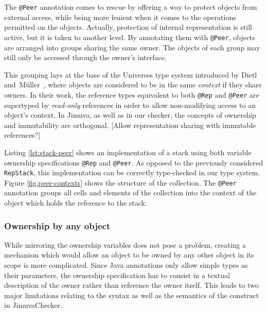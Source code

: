 \documentclass{pracamgr}
\theoremstyle{all}
\newcommand{\todo}[1]{{\color{red} [#1] }}
\begin{document}
The \texttt{@Peer} annotation comes to rescue by offering a way to
protect objects from external access, while being more lenient when it
comes to the operations permitted on the objects. Actually, protection
of internal representation is still active, but it is taken to another
level. By annotating them with \texttt{@Peer}, objects are arranged
into groups sharing the same owner. The objects of each group may
still only be accessed through the owner's interface.

This grouping lays at the base of the Universes type system introduced
by Dietl and~Müller~\cite{universes}, where objects are considered to
be in the same \emph{context} if they share owners. In their work, the
reference types equivalent to both \texttt{@Rep} and \texttt{@Peer}
are supertyped by \emph{read-only} references in order to allow
non-modifying access to an object's context. In Jimuva, as well as in
our checker, the concepts of ownership and immutability are
orthogonal. \todo{Allow representation sharing with immutable
  references?}

Listing \ref{lst:stack-peer} shows an implementation of a stack using
both variable ownership specifications \texttt{@Rep} and
\texttt{@Peer}. As opposed to the previously considered
\texttt{RepStack}, this implementation can be correctly type-checked
in our type system. Figure \ref{fig:peer-contexts} shows the structure
of the collection. The \texttt{@Peer} annotation groups all cells and
elements of the collection into the context of the object which holds
the reference to the stack.

\subsubsection{Ownership by any object}

While mirroring the ownership variables does not pose a problem,
creating a mechanism which would allow an object to be owned by any
other object in its scope is more complicated. Since Java annotations
only allow simple types as their parameters, the ownership
specification has to consist in a textual description of the owner
rather than reference the owner itself. This leads to two major
limitations relating to the syntax as well as the semantics of the
construct in JimuvaChecker.
\end{document}
